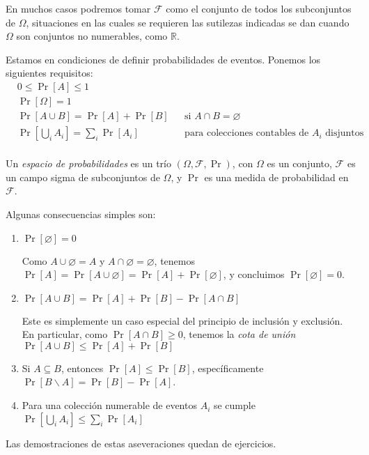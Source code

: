   En muchos casos podremos tomar \(\mathscr{F}\)
  como el conjunto de todos los subconjuntos de \(\Omega\),
  situaciones en las cuales se requieren las sutilezas indicadas
  se dan cuando \(\Omega\) son conjuntos no numerables,
  como \(\mathbb{R}\).

  Estamos en condiciones de definir probabilidades de eventos.
  Ponemos los siguientes requisitos:
  \begin{align}
    &0 \le \Pr[A] \le 1
         \label{eq:Pr-0-1} \\
    &\Pr[\Omega] = 1
         \label{eq:Pr-1} \\
    &\Pr[A \cup B]
       = \Pr[A] + \Pr[B]
      && \text{si \(A \cap B = \varnothing\)}
         \label{eq:Pr-union} \\
    &\Pr\left[ \bigcup_i A_i \right]
       = \sum_i \Pr[A_i]
      && \text{para colecciones contables de \(A_i\) disjuntos}
         \label{eq:Pr-union-contable} \\
  \end{align}
  \begin{definition}
    Un \emph{espacio de probabilidades} es un trío
    \((\Omega, \mathscr{F}, \Pr)\),
    con \(\Omega\) es un conjunto,
    \(\mathscr{F}\) es un campo sigma de subconjuntos de \(\Omega\),
    y \(\Pr\) es una medida de probabilidad en \(\mathscr{F}\).
  \end{definition}
  Algunas consecuencias simples son:
  \begin{enumerate}
  \item
    \(\Pr[\varnothing] = 0\)

    Como \(A \cup \varnothing = A\) y \(A \cap \varnothing = \varnothing\),
    tenemos \(\Pr[A] = \Pr[A \cup \varnothing] = \Pr[A] + \Pr[\varnothing]\),
    y concluimos \(\Pr[\varnothing] = 0\).
  \item
    \(\Pr[A \cup B] = \Pr[A] + \Pr[B] - \Pr[A \cap B]\)

    Este es simplemente un caso especial
    del principio de inclusión y exclusión.
    En particular,
    como \(\Pr[A \cap B] \ge 0\),
    tenemos la \emph{cota de unión} \(\Pr[A \cup B] \le \Pr[A] + \Pr[B]\)
  \item
    Si \(A \subseteq B\),
    entonces \(\Pr[A] \le \Pr[B]\),
    específicamente
      \(\Pr[B \smallsetminus A] = \Pr[B] - \Pr[A]\).
  \item
    Para una colección numerable de eventos \(A_i\)
    se cumple
    \(\Pr\left[ \bigcup_i A_i \right] \le \sum_i \Pr[A_i]\)
  \end{enumerate}
  Las demostraciones de estas aseveraciones quedan de ejercicios.

